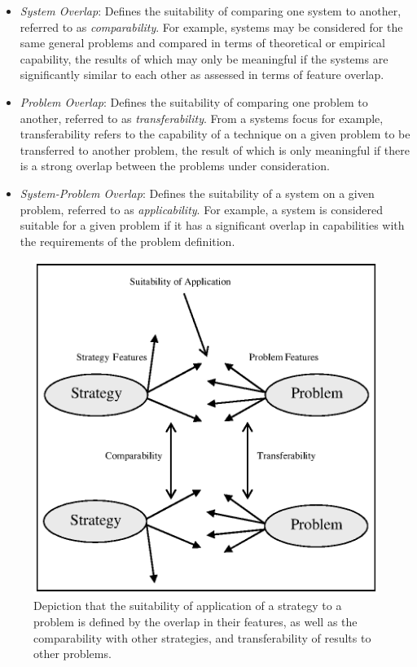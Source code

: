 \begin{itemize}
	\item \emph{System Overlap}: Defines the suitability of comparing one system to another, referred to as \emph{comparability}. For example, systems may be considered for the same general problems and compared in terms of theoretical or empirical capability, the results of which may only be meaningful if the systems are significantly similar to each other as assessed in terms of feature overlap. 
	\item \emph{Problem Overlap}: Defines the suitability of comparing one problem to another, referred to as \emph{transferability}. From a systems focus for example, transferability refers to the capability of a technique on a given problem to be transferred to another problem, the result of which is only meaningful if there is a strong overlap between the problems under consideration.
	\item \emph{System-Problem Overlap}: Defines the suitability of a system on a given problem, referred to as \emph{applicability}. For example, a system is considered suitable for a given problem if it has a significant overlap in capabilities with the requirements of the problem definition.
\end{itemize}


\begin{figure}[htp]
	\centering
		\includegraphics[scale=0.75]{IIDLE/problem-strategy-suitability}
	\caption{Depiction that the suitability of application of a strategy to a problem is defined by the overlap in their features, as well as the comparability with other strategies, and transferability of results to other problems.}
	\label{fig:problem-strategy-suitability}
\end{figure}

